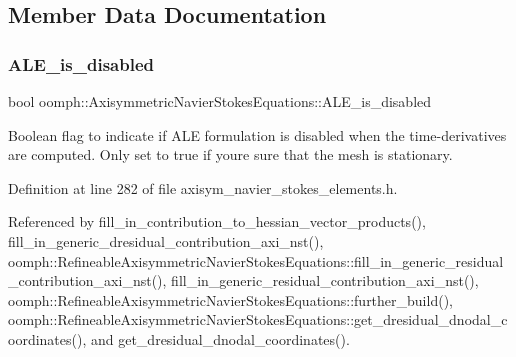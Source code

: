 \subsection{Member Data Documentation}
\mbox{\label{classoomph_1_1AxisymmetricNavierStokesEquations_a97f46e5472537187107d0454b6013b5f}} 
\subsubsection{\texorpdfstring{A\+L\+E\+\_\+is\+\_\+disabled}{ALE\_is\_disabled}}
{\footnotesize\ttfamily bool oomph\+::\+Axisymmetric\+Navier\+Stokes\+Equations\+::\+A\+L\+E\+\_\+is\+\_\+disabled\hspace{0.3cm}{\ttfamily [protected]}}



Boolean flag to indicate if A\+LE formulation is disabled when the time-\/derivatives are computed. Only set to true if you\textquotesingle{}re sure that the mesh is stationary. 



Definition at line 282 of file axisym\+\_\+navier\+\_\+stokes\+\_\+elements.\+h.



Referenced by fill\+\_\+in\+\_\+contribution\+\_\+to\+\_\+hessian\+\_\+vector\+\_\+products(), fill\+\_\+in\+\_\+generic\+\_\+dresidual\+\_\+contribution\+\_\+axi\+\_\+nst(), oomph\+::\+Refineable\+Axisymmetric\+Navier\+Stokes\+Equations\+::fill\+\_\+in\+\_\+generic\+\_\+residual\+\_\+contribution\+\_\+axi\+\_\+nst(), fill\+\_\+in\+\_\+generic\+\_\+residual\+\_\+contribution\+\_\+axi\+\_\+nst(), oomph\+::\+Refineable\+Axisymmetric\+Navier\+Stokes\+Equations\+::further\+\_\+build(), oomph\+::\+Refineable\+Axisymmetric\+Navier\+Stokes\+Equations\+::get\+\_\+dresidual\+\_\+dnodal\+\_\+coordinates(), and get\+\_\+dresidual\+\_\+dnodal\+\_\+coordinates().

\mbox{\label{classoomph_1_1AxisymmetricNavierStokesEquations_a11107d49963497a968799a6df6e6c015}} 
